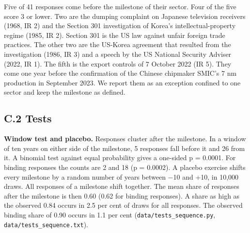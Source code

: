 Five of 41 responses come before the milestone of their sector. Four of
the five score 3 or lower. Two are the dumping complaint on Japanese
television receivers (1968, IR 2) and the Section 301 investigation of
Korea's intellectual-property regime (1985, IR 2). Section 301 is the US
law against unfair foreign trade practices. The other two are the
US-Korea agreement that resulted from the investigation (1986, IR 3) and
a speech by the US National Security Adviser (2022, IR 1). The fifth is
the export controls of 7 October 2022 (IR 5). They come one year before
the confirmation of the Chinese chipmaker SMIC's 7 nm production in
September 2023. We report them as an exception confined to one sector
and keep the milestone as defined.

\hypertarget{c.2-tests}{%
\subsection*{C.2 Tests}\label{c.2-tests}}

\textbf{Window test and placebo.} Responses cluster after the milestone.
In a window of ten years on either side of the milestone, 5 responses
fall before it and 26 from it. A binomial test against equal probability
gives a one-sided p = 0.0001. For binding responses the counts are 2 and
18 (p = 0.0002). A placebo exercise shifts every milestone by a random
number of years between −10 and +10, in 10,000 draws. All responses of a
milestone shift together. The mean share of responses after the
milestone is then 0.60 (0.62 for binding responses). A share as high as
the observed 0.84 occurs in 2.5 per cent of draws for all responses. The
observed binding share of 0.90 occurs in 1.1 per cent
(\texttt{data/\allowbreak{}tests\_\allowbreak{}sequence.py}, \texttt{data/\allowbreak{}tests\_\allowbreak{}sequence.txt}).


